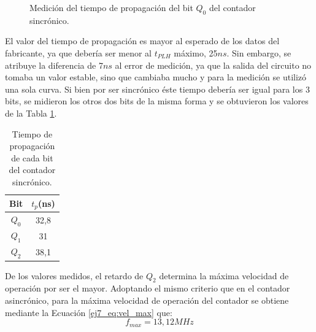 \begin{figure}[H]
	\centering
	\caption{Medici\'on del tiempo de propagaci\'on del bit $Q_0$ del contador sincr\'onico.}
	\label{ej7_fig:sinc_q0_meas}
\end{figure}
\noindent
El valor del tiempo de propagaci\'on es mayor al esperado de los datos del fabricante, ya que deber\'ia ser menor al $t_{PLH}$ m\'aximo, 25$ns$. Sin embargo, se atribuye la diferencia de 7$ns$ al error de medici\'on, ya que la salida
del circuito no tomaba un valor estable, sino que cambiaba mucho y para la medici\'on se utiliz\'o una sola curva.
Si bien por ser sincr\'onico \'este tiempo deber\'ia ser igual para los 3 bits, se midieron los otros dos bits de la misma forma y se obtuvieron los valores de la Tabla \ref{ej7_tab:t_prop_all}.
%
\begin{table}[H]
\centering
\begin{tabular}{|c|c|}
\hline
\textbf{Bit} & \textbf{$t_p$(ns)} \\ \hline
$Q_0$           & 32,8            \\ \hline
$Q_1$           & 31              \\ \hline
$Q_2$           & 38,1            \\ \hline
\end{tabular}
\caption{Tiempo de propagaci\'on de cada bit del contador sincr\'onico.}
\label{ej7_tab:t_prop_all}
\end{table}
%
\noindent
De los valores medidos, el retardo de $Q_2$ determina la m\'axima velocidad de operaci\'on por ser el mayor. Adoptando el mismo criterio que en el contador asincr\'onico, para la m\'axima velocidad de operaci\'on del contador se obtiene mediante la Ecuaci\'on \ref{ej7_eq:vel_max} que:
\begin{equation*}
    f_{max} = 13,12MHz
\end{equation*}
%
